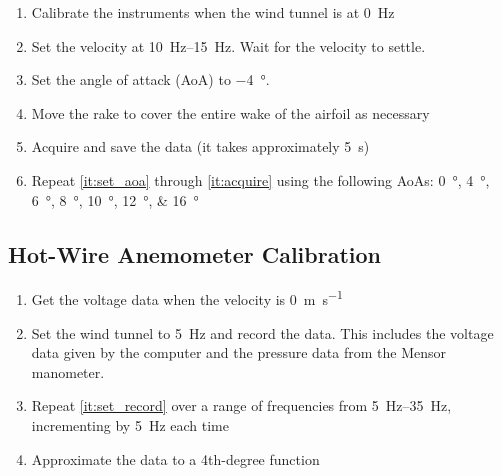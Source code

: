 \begin{enumerate}
    \item Calibrate the instruments when the wind tunnel is at \qty{0}{\hertz}
    \item Set the velocity at \qtyrange{10}{15}{\hertz}. Wait for the velocity to settle.  
    \item Set the angle of attack (AoA) to \qty{-4}{\degree}. \label{it:set_aoa} 
    \item Move the rake to cover the entire wake of the airfoil as necessary 
    \item Acquire and save the data (it takes approximately \qty{5}{\second}) \label{it:acquire}
    \item Repeat \autoref{it:set_aoa} through \autoref{it:acquire} using the following AoAs: \qtylist{0;4;6;8;10;12;16}{\degree}
\end{enumerate}

\subsection{Hot-Wire Anemometer Calibration} 

\begin{enumerate}
    \item Get the voltage data when the velocity is \qty{0}{\meter\per\second}
    \item Set the wind tunnel to \qty{5}{\hertz} and record the data. This includes the voltage data given by the computer and the pressure data from the Mensor manometer. \label{it:set_record}
    \item Repeat \autoref{it:set_record} over a range of frequencies from \qtyrange{5}{35}{\hertz}, incrementing by \qty{5}{\hertz} each time
    \item Approximate the data to a 4th-degree function
\end{enumerate}